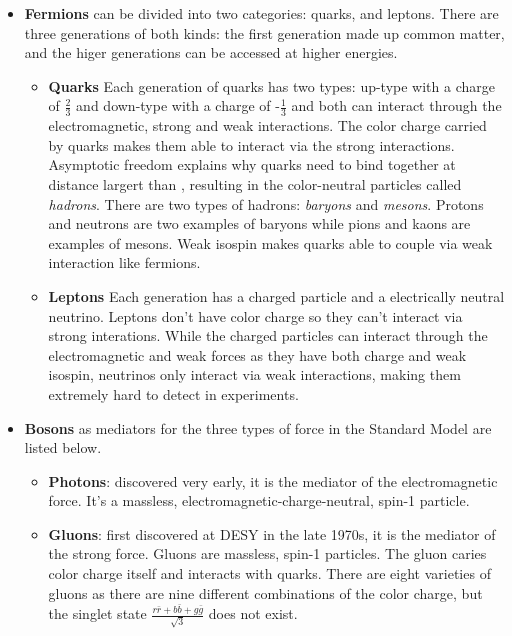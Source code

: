 \begin{itemize}
  \item \textbf{Fermions} can be divided into two categories: quarks, and leptons. There are three generations of both kinds: the first generation made up common matter, and the higer generations can be accessed at higher energies.
\begin{itemize}
  \item \textbf{Quarks} Each generation of quarks has two types: up-type with a charge of $\frac{2}{3}$ and down-type with a charge of -$\frac{1}{3}$ and both
      can interact through the electromagnetic, strong and weak interactions. The color charge carried by quarks makes them able to 
interact via the strong interactions. Asymptotic freedom explains why quarks need to bind together at distance largert than , resulting in the color-neutral particles called \textit{hadrons}. There are two types of hadrons: \textit{baryons} and \textit{mesons}. Protons and neutrons are two examples of baryons while pions and kaons are examples of mesons. Weak isospin makes quarks able to couple via weak interaction like fermions.
  \item \textbf{Leptons} Each generation has a charged particle and a electrically neutral neutrino. Leptons don't have color charge so they can't interact via strong interations. While the charged particles can interact through the electromagnetic and weak forces as they have both charge and weak isospin, neutrinos only interact via weak interactions, making them extremely hard to detect in experiments.
\end{itemize}
  \item \textbf{Bosons} as mediators for the three types of force in the Standard Model are listed below.
\begin{itemize}
  \item \textbf{Photons}: discovered very early, it is the mediator of the electromagnetic force. It's a massless, electromagnetic-charge-neutral, spin-1 particle.
  \item \textbf{Gluons}: first discovered at DESY in the late 1970s, it is the mediator of the strong force. 
      Gluons are massless, spin-1 particles. The gluon caries color charge itself and interacts with quarks. 
        There are eight varieties of gluons as there are nine different combinations of the color charge, but the singlet state $\frac{r\bar{r}+b\bar{b}+g\bar{g}}{\sqrt{3}}$ does not exist.


\end{itemize}
\end{itemize}
